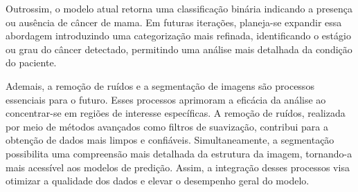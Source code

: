Outrossim, o modelo atual retorna uma classificação binária indicando a presença ou ausência de câncer de mama. Em futuras iterações, planeja-se expandir essa abordagem introduzindo uma categorização mais refinada, identificando o estágio ou grau do câncer detectado, permitindo uma análise mais detalhada da condição do paciente.

Ademais, a remoção de ruídos e a segmentação de imagens são processos essenciais para o futuro. Esses processos aprimoram a eficácia da análise ao concentrar-se em regiões de interesse específicas. A remoção de ruídos, realizada por meio de métodos avançados como filtros de suavização, contribui para a obtenção de dados mais limpos e confiáveis. Simultaneamente, a segmentação possibilita uma compreensão mais detalhada da estrutura da imagem, tornando-a mais acessível aos modelos de predição. Assim, a integração desses processos visa otimizar a qualidade dos dados e elevar o desempenho geral do modelo.